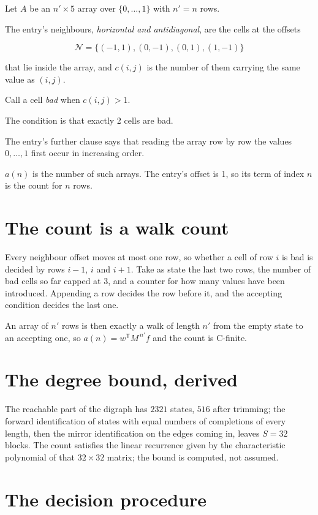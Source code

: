 \documentclass[11pt]{article}
\theoremstyle{definition}
\begin{document}
Let $A$ be an $n' \times 5$ array over $\{0,\dots,1\}$ with $n' = n$ rows.

The entry's neighbours, {\itshape horizontal and antidiagonal}, are the cells at the offsets

\[\mathcal{N} = \{(-1,1), (0,-1), (0,1), (1,-1)\}\]

that lie inside the array, and $c(i,j)$ is the number of them carrying the same value as $(i,j)$.

Call a cell {\itshape bad} when $c(i,j) > 1$.

The condition is that exactly 2 cells are bad.

The entry's further clause says that reading the array row by row the values $0,\dots,1$ first occur in increasing order.

$a(n)$ is the number of such arrays. The entry's offset is 1, so its term of index $n$ is the count for $n$ rows.

\section{The count is a walk count}

Every neighbour offset moves at most one row, so whether a cell of row $i$ is bad is decided by rows $i-1$, $i$ and $i+1$. Take as state the last two rows, the number of bad cells so far capped at 3, and a counter for how many values have been introduced. Appending a row decides the row before it, and the accepting condition decides the last one.

An array of $n'$ rows is then exactly a walk of length $n'$ from the empty state to an accepting one, so $a(n) = w^{\mathsf T}M^{\,n'}f$ and the count is C-finite.

\section{The degree bound, derived}

The reachable part of the digraph has $2321$ states, $516$ after trimming; the forward identification of states with equal numbers of completions of every length, then the mirror identification on the edges coming in, leaves $S = 32$ blocks. The count satisfies the linear recurrence given by the characteristic polynomial of that $32\times32$ matrix; the bound is computed, not assumed.

\section{The decision procedure}
\end{document}

